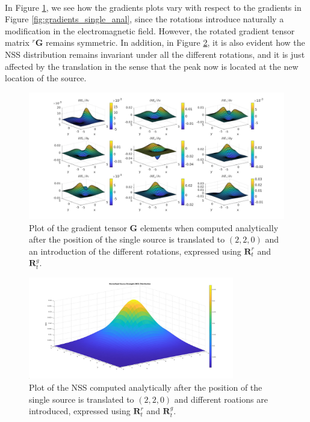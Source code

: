 \documentclass[main]{subfiles}
\begin{document}
\noindent\\
In Figure \ref{fig:gradients_rotated_single_anal}, we see how the gradients plots
vary with respect to the gradients in Figure \ref{fig:gradients_single_anal},
since the rotations introduce naturally a modification in the electromagnetic field.
However, the rotated gradient tensor matrix ${}^r \mathbf{G}$ remains symmetric.
In addition, in Figure \ref{fig:NSS_rotated_single_anal}, it is also evident how the
NSS distribution remains invariant under all the different rotations, and it is 
just affected by the translation in the sense that the peak now is located
at the new location of the source. 
\begin{figure}
\centering
\hspace*{-0.2\textwidth}
\includegraphics[width=1.4\textwidth]{images/gradients_rotated_single_anal.jpg}
\caption{Plot of the gradient tensor $\mathbf{G}$ elements
when computed analytically after the position of the single source is translated to $(2,2,0)$ and an 
introduction of the different rotations, expressed using $\mathbf{R}^r_t$ and $\mathbf{R}_t^g$.}
\label{fig:gradients_rotated_single_anal}
\end{figure}
\begin{figure}
    \centering
    \includegraphics[width=0.8\textwidth]{images/NSS_rotated_single_anal.jpg}
    \caption{Plot of the NSS computed analytically after the position of the single source is translated to $(2,2,0)$ and 
    different roations are introduced, expressed using $\mathbf{R}^r_t$ and $\mathbf{R}_t^g$.}
    \label{fig:NSS_rotated_single_anal}
\end{figure}
\end{document}
